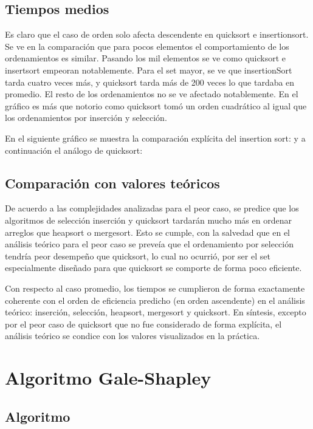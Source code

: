 \documentclass[article,a4paper]{article}
\begin{document}
\subsection{Tiempos medios}

Es claro que el caso de orden solo afecta descendente en quicksort e insertionsort.
Se ve en la comparación que para pocos elementos el comportamiento de los ordenamientos es similar. Pasando los mil elementos se ve como quicksort e insertsort empeoran notablemente. Para el set mayor, se ve que insertionSort tarda cuatro veces más, y quicksort tarda más de 200 veces lo que tardaba en promedio. El resto de los ordenamientos no se ve afectado notablemente.
En el gráfico es más que notorio como quicksort tomó un orden cuadrático al igual que los ordenamientos por inserción y selección.

En el siguiente gráfico se muestra la comparación explícita del insertion sort:
y a continuación el análogo de quicksort:

\subsection{Comparación con valores teóricos}

De acuerdo a las complejidades analizadas para el peor caso, se predice que los algoritmos de selección inserción y quicksort tardarán mucho más en ordenar arreglos que heapsort o mergesort. Esto se cumple, con la salvedad que en el análisis teórico para el peor caso se preveía que el ordenamiento por selección tendría peor desempeño que quicksort, lo cual no ocurrió, por ser el set especialmente diseñado para que quicksort se comporte de forma poco eficiente.

Con respecto al caso promedio, los tiempos se cumplieron de forma exactamente coherente con el orden de eficiencia predicho (en orden ascendente) en el análisis teórico: inserción, selección, heapsort, mergesort y quicksort. En síntesis, excepto por el peor caso de quicksort que no fue considerado de forma explícita, el análisis teórico se condice con los valores visualizados en la práctica.



\section{Algoritmo Gale-Shapley}

\subsection{Algoritmo}
\end{document}
